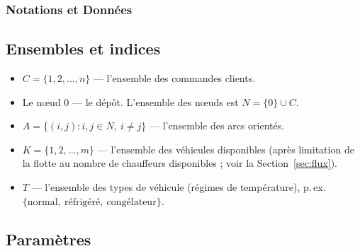 \documentclass[12pt,a4paper]{report}
\begin{document}
\subsubsection{Notations et Données}

\subsection{Ensembles et indices}

\begin{itemize}[leftmargin=2.2em]
  \item $C = \{1, 2, \dots, n\}$ --- l'ensemble des commandes clients.
  \item Le nœud $0$ --- le dépôt. L'ensemble des nœuds est $N = \{0\} \cup C$.
  \item $A = \{(i,j) : i,j \in N,\ i \neq j\}$ --- l'ensemble des arcs
        orientés.
  \item $K = \{1, 2, \dots, m\}$ --- l'ensemble des véhicules disponibles
        (après limitation de la flotte au nombre de chauffeurs disponibles ;
        voir la Section~\ref{sec:flux}).
  \item $T$ --- l'ensemble des types de véhicule (régimes de température),
        p.\,ex. $\{\text{normal},\ \text{réfrigéré},\ \text{congélateur}\}$.
\end{itemize}

\subsection{Paramètres}
\end{document}
